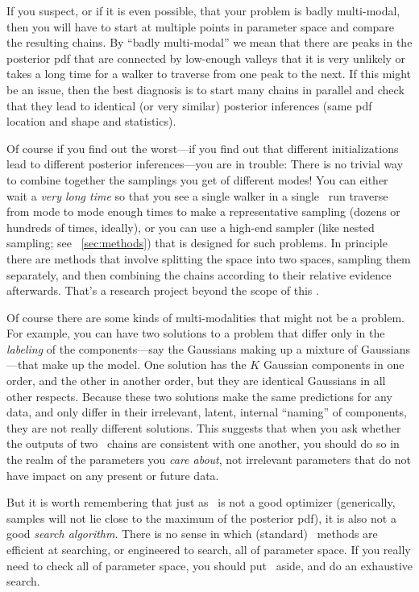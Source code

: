 \documentclass[modern]{aastex61}
\newcommand{\MCMC}{\acronym{MCMC}}
\begin{document}
If you suspect, or if it is even possible, that your problem is badly
multi-modal, then you will have to start at multiple points in
parameter space and compare the resulting chains.
By ``badly multi-modal'' we mean that there are peaks in the posterior
pdf that are connected by low-enough valleys that it is very unlikely
or takes a long time for a walker to traverse from one peak to the
next.
If this might be an issue, then the best diagnosis is to start many
chains in parallel and check that they lead to identical (or very
similar) posterior inferences (same pdf location and shape and
statistics).

Of course if you find out the worst---if you find out that different
initializations lead to different posterior inferences---you are in
trouble:
There is no trivial way to combine together the samplings you get of
different modes!
You can either wait a \emph{very long time} so that you see a single
walker in a single \MCMC\ run traverse from mode to mode enough times to
make a representative sampling (dozens or hundreds of times, ideally),
or you can use a high-end sampler (like nested sampling; see \sectionname~\ref{sec:methods}) that is
designed for such problems.
In principle there are methods that involve splitting the space into
two spaces, sampling them separately, and then combining the chains
according to their relative evidence afterwards.
That's a research project beyond the scope of this \documentname.

Of course there are some kinds of multi-modalities that might not be a
problem.
For example, you can have two solutions to a problem that differ only
in the \emph{labeling} of the components---say the Gaussians making up
a mixture of Gaussians---that make up the model.
One solution has the $K$ Gaussian components in one order, and the
other in another order, but they are identical Gaussians in all
other respects.
Because these two solutions make the same predictions for any data, and
only differ in their irrelevant, latent, internal ``naming'' of components,
they are not really different solutions.
This suggests that when you ask whether the outputs of two \MCMC\ chains
are consistent with one another, you should do so in the realm of the
parameters you \emph{care about}, not irrelevant parameters that do
not have impact on any present or future data.

But it is worth remembering that just as \MCMC\ is not a good optimizer
(generically, samples will not lie close to the maximum of the posterior pdf),
it is also not a good \emph{search algorithm}.
There is no sense in which (standard) \MCMC\ methods are efficient at
searching, or engineered to search, all of parameter space.
If you really need to check all of parameter space, you should put
\MCMC\ aside, and do an exhaustive search.
\end{document}

